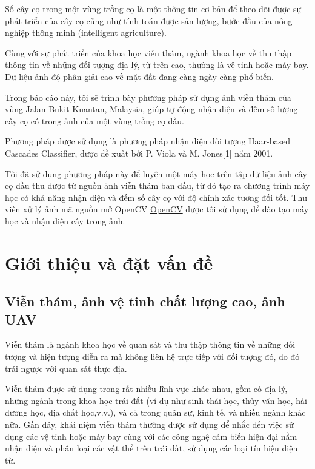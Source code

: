 \documentclass[14pt, oneside, a4paper, openany]{scrartcl}
\begin{document}
Số cây cọ trong một vùng trồng cọ là một thông tin cơ bản để theo dõi được sự phát triển của cây cọ cũng như tính toán được sản lượng, bước đầu của nông nghiệp thông minh (intelligent agriculture).

Cùng với sự phát triển của khoa học viễn thám, ngành khoa học về thu thập thông tin về những đối tượng địa lý, từ trên cao, thường là vệ tinh hoặc máy bay. Dữ liệu ảnh độ phân giải cao về mặt đất đang càng ngày càng phổ biến.

Trong báo cáo này, tôi sẽ trình bày phương pháp sử dụng ảnh viễn thám của vùng Jalan Bukit Kuantan, Malaysia, giúp tự động nhận diện và đếm số lượng cây cọ có trong ảnh của một vùng trồng cọ dầu.

Phương pháp được sử dụng là phương pháp nhận diện đối tượng Haar-based Cascades Classifier, được đề xuất bởi P. Viola và M. Jones[1] năm 2001.

Tôi đã sử dụng phương pháp này để luyện một máy học trên tập dữ liệu ảnh cây cọ dầu thu được từ nguồn ảnh viễn thám ban đầu, từ đó tạo ra chương trình máy học có khả năng nhận diện và đếm số cây cọ với độ chính xác tương đối tốt. Thư viên xử lý ảnh mã nguồn mở OpenCV \href{http://opencv.org}{OpenCV} \cite{opencv} được tôi sử dụng để đào tạo máy học và nhận diện cây trong ảnh.
\newpage
\section{Giới thiệu và đặt vấn đề}
\subsection{Viễn thám, ảnh vệ tinh chất lượng cao, ảnh UAV}
Viễn thám  là ngành khoa học về quan sát và thu thập thông tin về những đối tượng và hiện tượng diễn ra mà không liên hệ trực tiếp với đối tượng đó, do đó trái ngược với quan sát thực địa.

Viễn thám được sử dụng trong rất nhiều lĩnh vực khác nhau, gồm có địa lý, những ngành trong khoa học trái đất (ví dụ như sinh thái học, thủy văn học, hải dương học, địa chất học,v.v.), và cả trong quân sự, kinh tế, và nhiều ngành khác nữa.
Gần đây, khái niệm viễn thám thường được sử dụng để nhắc đến việc sử dụng các vệ tinh hoặc máy bay cùng với các công nghệ cảm biến hiện đại nằm nhận diện và phân loại các vật thể trên trái đất, sử dụng các loại tín hiệu điện từ.
\end{document}
